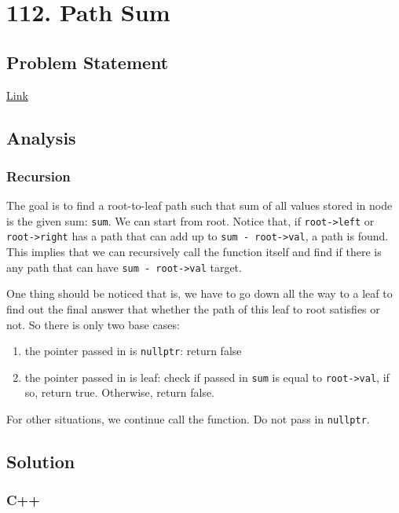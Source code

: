 \documentclass[12pt]{book}
\begin{document}
\chapter{112. Path Sum}
\label{sec:orgeaca132}
\section{Problem Statement}
\label{sec:org50e228f}
\href{https://leetcode.com/problems/path-sum/}{Link}
\section{Analysis}
\label{sec:org8bf7fd5}
\subsection{Recursion}
\label{sec:org70868b9}
The goal is to find a root-to-leaf path such that sum of all values stored in node is the given sum: \texttt{sum}. We can start from root. Notice that, if \texttt{root->left} or \texttt{root->right} has a path that can add up to \texttt{sum - root->val}, a path is found. This implies that we can recursively call the function itself and find if there is any path that can have \texttt{sum - root->val} target.

One thing should be noticed that is, we have to go down all the way to a leaf to find out the final answer that whether the path of this leaf to root satisfies or not. So there is only two base cases:
\begin{enumerate}
\item the pointer passed in is \texttt{nullptr}: return false
\item the pointer passed in is leaf: check if passed in \texttt{sum} is equal to \texttt{root->val}, if so, return true. Otherwise, return false.
\end{enumerate}

For other situations, we continue call the function. Do not pass in \texttt{nullptr}.

\section{Solution}
\label{sec:org39128e9}
\subsection{C++}
\label{sec:org9a6f387}
\end{document}
